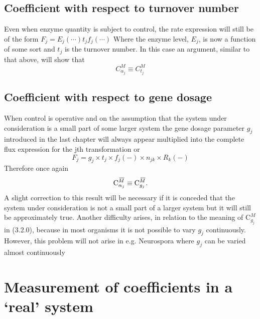 \subsection{Coefficient with respect to turnover number}

Even when enzyme quantity is subject to control, the rate expression will still be of the form $F_{j}=E_{j} (\cdots) t_{j} f_{j} (\cdots)$ Where the enzyme level, $E_{j}$, is now a function of some sort and $t_{j}$ is the turnover number. In this case an argument, similar to that above, will show that
%
\begin{equation}
C_{\alpha_{j}}^{M} \equiv C_{t_{j}}^{M}
\label{eqn:319}
\end{equation}
%

\subsection{Coefficient with respect to gene dosage}

When control is operative and on the assumption that the system under consideration is a small part of some larger system the gene dosage parameter $g_{j}$ introduced in the last chapter will always appear multiplied into the complete flux expression for the jth transformation or
%
$$
F_{j}=g_{j} \times t_{j} \times f_{j}(-) \times n_{jk} \times R_{k}(-)
$$
%
Therefore once again
%
\begin{equation}
\mathrm{C}_{\alpha_j}^{\,\overline{\!{M}}} \equiv \mathrm{C}_{g_j}^{\,\overline{\!{M}}}.
\label{eqn:320}
\end{equation}
%
A slight correction to this result will be necessary if it is conceded that the system under consideration is not a small part of a larger system but it will still be approximately true. Another difficulty arises, in relation to the meaning of $\mathrm{C}_{g_{j}}^{M}$ in (3.2.0), because in most organisms it is not possible to vary $g_{j}$ continuously. However, this problem will not arise in e.g. Neurospora where $g_{j}$ can be varied almost continuously

\section{Measurement of coefficients in a `real' system}

